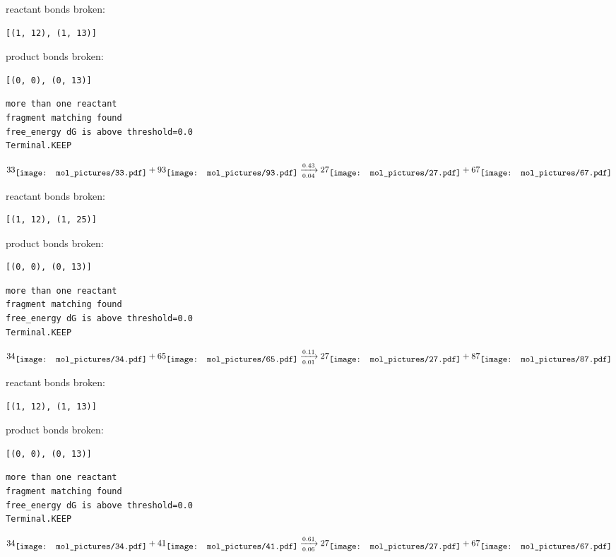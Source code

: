 \documentclass{article}
\begin{document}
reactant bonds broken:\begin{verbatim}
[(1, 12), (1, 13)]
\end{verbatim}
product bonds broken:\begin{verbatim}
[(0, 0), (0, 13)]
\end{verbatim}




\vspace{1cm}
\begin{verbatim}
more than one reactant
fragment matching found
free_energy dG is above threshold=0.0
Terminal.KEEP
\end{verbatim}
$$
33
\raisebox{-.5\height}{\texttt{[image: mol\_pictures/33.pdf]}}
+
93
\raisebox{-.5\height}{\texttt{[image: mol\_pictures/93.pdf]}}
\xrightarrow[0.04]{0.43}
27
\raisebox{-.5\height}{\texttt{[image: mol\_pictures/27.pdf]}}
+
67
\raisebox{-.5\height}{\texttt{[image: mol\_pictures/67.pdf]}}
$$


reactant bonds broken:\begin{verbatim}
[(1, 12), (1, 25)]
\end{verbatim}
product bonds broken:\begin{verbatim}
[(0, 0), (0, 13)]
\end{verbatim}




\vspace{1cm}
\begin{verbatim}
more than one reactant
fragment matching found
free_energy dG is above threshold=0.0
Terminal.KEEP
\end{verbatim}
$$
34
\raisebox{-.5\height}{\texttt{[image: mol\_pictures/34.pdf]}}
+
65
\raisebox{-.5\height}{\texttt{[image: mol\_pictures/65.pdf]}}
\xrightarrow[0.01]{0.11}
27
\raisebox{-.5\height}{\texttt{[image: mol\_pictures/27.pdf]}}
+
87
\raisebox{-.5\height}{\texttt{[image: mol\_pictures/87.pdf]}}
$$


reactant bonds broken:\begin{verbatim}
[(1, 12), (1, 13)]
\end{verbatim}
product bonds broken:\begin{verbatim}
[(0, 0), (0, 13)]
\end{verbatim}




\vspace{1cm}
\begin{verbatim}
more than one reactant
fragment matching found
free_energy dG is above threshold=0.0
Terminal.KEEP
\end{verbatim}
$$
34
\raisebox{-.5\height}{\texttt{[image: mol\_pictures/34.pdf]}}
+
41
\raisebox{-.5\height}{\texttt{[image: mol\_pictures/41.pdf]}}
\xrightarrow[0.06]{0.61}
27
\raisebox{-.5\height}{\texttt{[image: mol\_pictures/27.pdf]}}
+
67
\raisebox{-.5\height}{\texttt{[image: mol\_pictures/67.pdf]}}
$$
\end{document}
